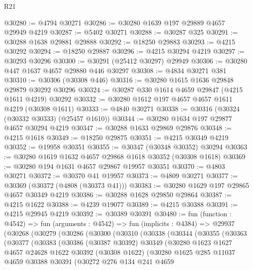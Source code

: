 \begin{lexlean}{R21}
\begin{coremodule}
@30280 := @4794 @30271
@30286 := @30280 @1639 @197 @29889 @4657 @29949 @4219
@30287 := @5402 @30271
@30288 := @30287 @325
@30291 := @30288 @1638 @29881 @29888
@30292 := @18250 @29883
@30293 := @4215 @30292
@30294 := @18250 @29887
@30296 := @4215 @30294 @4219
@30297 := @30293 @30296
@30300 := @30291 (@25412 @30297) @29949
@30306 := @30280 @447 @1637 @4657 @29880 @446 @30297
@30308 := @4834 @30271 @381
@30310 := @30306 (@30308 @446)
@30316 := @30280 @1615 @1636 @29848 @29879 @30292 @30296
@30324 := @30287 @330 @1614 @4659 @29847 (@4215 @1611 @4219) @30292
@30332 := @30280 @1612 @197 @4657 @4657 @1611 @4219 (@30308 @1611)
@30333 := @4840 @30271
@30338 := @30316 (@30324 (@30332 @30333) (@25457 @1610))
@30344 := @30280 @1634 @197 @29877 @4657 @30294 @4219
@30347 := @30288 @1633 @29869 @29876
@30348 := @4215 @1618
@30349 := @18250 @29875
@30351 := @4215 @30349 @4219
@30352 := @19958 @30351
@30355 := @30347 (@30348 @30352) @30294
@30363 := @30280 @1619 @1632 @4657 @29868 @1618 @30352 (@30308 @1618)
@30369 := @30280 @194 @1631 @4657 @29867 @19957 @30351
@30370 := @4803 @30271
@30372 := @30370 @41 @19957
@30373 := @4809 @30271
@30377 := @30369 (@30372 (@4808 (@30373 @41)))
@30383 := @30280 @1629 @197 @29865 @4657 @30349 @4219
@30386 := @30288 @1628 @29850 @29864
@30387 := @4215 @1622
@30388 := @4239 @19077
@30389 := @4215 @30388
@30391 := @4215 @29945 @4219
@30392 := @30389 @30391
@30480 := fun (function : @4542) =>
  fun (arguments : @4542) =>
  fun (implicits : @4384) =>
  @29937
    (@30268
      (@30279
        (@30286
          (@30300
            (@30310
              (@30338
                (@30344
                  (@30355
                    (@30363
                      (@30377
                        (@30383
                          (@30386
                            (@30387 @30392)
                            @30349
                            (@30280
                              @1623
                              @1627
                              @4657
                              @24628
                              @1622
                              @30392
                              (@30308 @1622)
                              (@30280
                                @1625
                                @285
                                @11037
                                @4659
                                @30388
                                @30391
                                (@30272
                                  @276
                                  @134
                                  @241
                                  @4659

\end{coremodule}
\end{lexlean}
